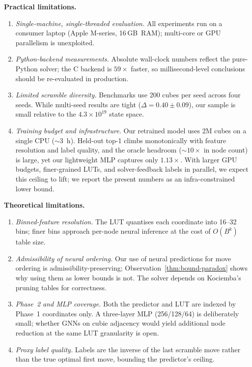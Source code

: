 \documentclass[graybox]{svmult}
\begin{document}
\textbf{Practical limitations.}
\begin{enumerate}[leftmargin=*, itemsep=0.2em]
  \item \emph{Single-machine, single-threaded evaluation.} All experiments run on a consumer laptop (Apple M-series, 16\,GB~RAM); multi-core or GPU parallelism is unexploited.
  \item \emph{Python-backend measurements.} Absolute wall-clock numbers reflect the pure-Python solver; the C backend is $59\times$ faster, so millisecond-level conclusions should be re-evaluated in production.
  \item \emph{Limited scramble diversity.} Benchmarks use 200 cubes per seed across four seeds. While multi-seed results are tight ($\Delta = 0.40 \pm 0.09$), our sample is small relative to the $4.3 \times 10^{19}$ state space.
  \item \emph{Training budget and infrastructure.} Our retrained model uses 2M cubes on a single CPU ($\sim$3~h). Held-out top-1 climbs monotonically with feature resolution and label quality, and the oracle headroom ($\sim$$10\times$ in node count) is large, yet our lightweight MLP captures only $1.13\times$. With larger GPU budgets, finer-grained LUTs, and solver-feedback labels in parallel, we expect this ceiling to lift; we report the present numbers as an infra-constrained lower bound.
\end{enumerate}

\textbf{Theoretical limitations.}
\begin{enumerate}[leftmargin=*, itemsep=0.2em]
  \item \emph{Binned-feature resolution.} The LUT quantises each coordinate into 16--32 bins; finer bins approach per-node neural inference at the cost of $O(B^k)$ table size.
  \item \emph{Admissibility of neural ordering.} Our use of neural predictions for move ordering is admissibility-preserving; Observation~\ref{thm:bound-paradox} shows why using them as lower bounds is not. The solver depends on Kociemba's pruning tables for correctness.
  \item \emph{Phase~2 and MLP coverage.} Both the predictor and LUT are indexed by Phase~1 coordinates only. A three-layer MLP (256/128/64) is deliberately small; whether GNNs on cubie adjacency would yield additional node reduction at the same LUT granularity is open.
  \item \emph{Proxy label quality.} Labels are the inverse of the last scramble move rather than the true optimal first move, bounding the predictor's ceiling.
\end{enumerate}
\end{document}
